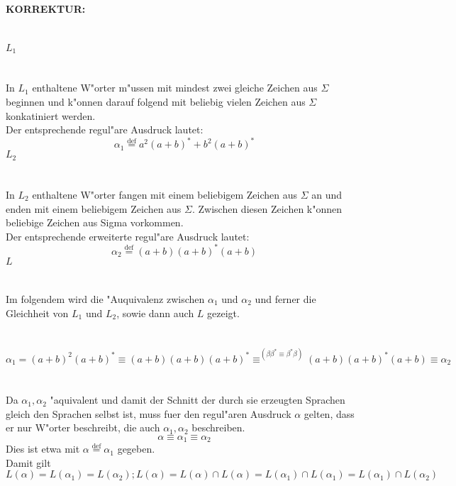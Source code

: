 \documentclass{article}
\newcommand{\gap}{\null\ \\ \\}
\newcommand{\task}[1]{\textbf{#1} \\ \gap}
\newcommand{\correction}{\task{KORREKTUR:}}
\newcommand{\mdef}{\overset{\text{def}}{=}}
\begin{document}
\correction
\task{$L_1$}
In $L_1$ enthaltene W"orter m"ussen mit mindest zwei gleiche Zeichen aus 
    $\Sigma$ beginnen und k"onnen darauf folgend mit beliebig vielen
    Zeichen aus $\Sigma$ konkatiniert werden.\\
Der entsprechende regul"are Ausdruck lautet:\[
    \alpha_1 \mdef a^2 (a+b)^* + b^2 (a+b)^*
    \]
\task{$L_2$}
In $L_2$ enthaltene W"orter fangen mit einem beliebigem Zeichen aus $\Sigma$ an
    und enden mit einem beliebigem Zeichen aus $\Sigma$. Zwischen diesen Zeichen
    k"onnen beliebige Zeichen aus Sigma vorkommen.\\
Der entsprechende erweiterte regul"are Ausdruck lautet:\[
    \alpha_2 \mdef (a+b)(a+b)^*(a+b)
    \]
\task{$L$}
Im folgendem wird die "Auquivalenz zwischen $\alpha_1$ und $\alpha_2$ und ferner
    die Gleichheit von $L_1$ und $L_2$, sowie dann auch $L$ gezeigt.\\
\gap
\[
    \alpha_1 = (a+b)^2(a+b)^*
        \equiv (a+b)(a+b)(a+b)^*
        \equiv^{(\beta \beta^* \equiv \beta^* \beta)} 
            (a+b)(a+b)^*(a+b)
        \equiv \alpha_2
    \]
\gap
Da $\alpha_1,\alpha_2$ "aquivalent und damit der Schnitt der durch sie erzeugten
    Sprachen gleich den Sprachen selbst ist, muss
    fuer den regul"aren Ausdruck $\alpha$ gelten, dass er nur W"orter
    beschreibt, die auch $\alpha_1,\alpha_2$ beschreiben.\[
    \alpha \equiv \alpha_1 \equiv \alpha_2
    \]
Dies ist etwa mit $\alpha \mdef \alpha_1$ gegeben.\\
Damit gilt \[
    L(\alpha) = L(\alpha_1) = L(\alpha_2);
    L(\alpha )= L(\alpha) \cap L(\alpha)
        = L(\alpha_1) \cap L(\alpha_1)
        = L(\alpha_1) \cap L(\alpha_2) 
    \]
\end{document}
